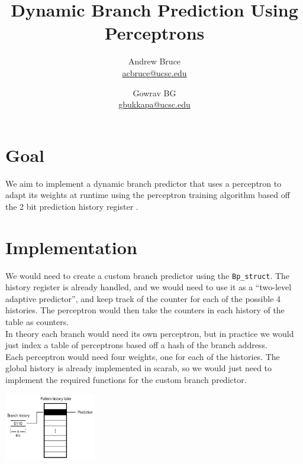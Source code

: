 \documentclass{article}
\title{Dynamic Branch Prediction Using Perceptrons}
\author{Andrew Bruce \\ \href{mailto:acbruce@ucsc.edu}{acbruce@ucsc.edu}
  \and Gowrav BG \\ \href{mailto:gbukkapa@ucsc.edu}{gbukkapa@ucsc.edu} }
\begin{document}
\maketitle
{}
\section*{Goal}
We aim to implement a dynamic branch predictor that uses a perceptron to adapt its weights at runtime using the perceptron training algorithm based off the 2 bit prediction history register \cite{article}.
\section*{Implementation}
We would need to create a custom branch predictor using the \verb=Bp_struct=. The history register is already handled, and we would need to use it as a ``two-level adaptive predictor'', and keep track of the counter for each of the possible 4 histories. The perceptron would then take the counters in each history of the table as counters.\\
In theory each branch would need its own perceptron, but in practice we would just index a table of perceptrons based off a hash of the branch address.\\
Each perceptron would need four weights, one for each of the histories. The global history is already implemented in scarab, so we would just need to implement the required functions for the custom branch predictor.
\begin{center}
  \includegraphics[width=0.3\textwidth]{table.png}
\end{center}


\end{document}
